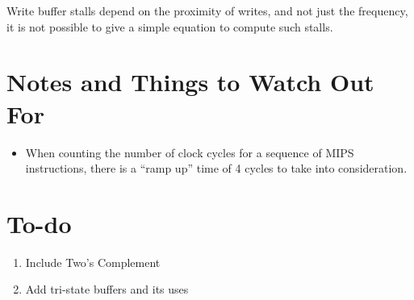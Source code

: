 \documentclass[12pt]{article}
\theoremstyle{definition}
\begin{document}
  Write buffer stalls depend on the proximity of writes, and not just the frequency, it is not possible to give a simple equation to compute such stalls.





  \newpage
  \section{Notes and Things to Watch Out For}
  \begin{itemize}
    \item When counting the number of clock cycles for a sequence of MIPS instructions, there is a ``ramp up'' time of 4 cycles to take into consideration.
  \end{itemize}

  \newpage
  \section{To-do}
  \begin{enumerate}
    \item Include Two's Complement
    \item Add tri-state buffers and its uses
  \end{enumerate}
\end{document}
